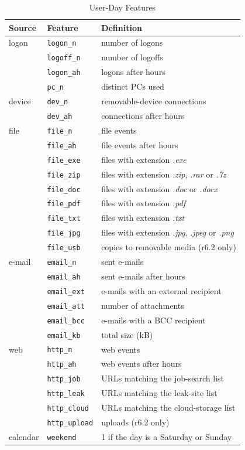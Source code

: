 \documentclass[10pt,onecolumn,letterpaper]{article}
\begin{document}
\begin{table}[!t]
\caption{User-Day Features\label{tab:s-features}}
\centering
\footnotesize
\begin{tabular}{@{}llp{4.6cm}@{}}
\toprule
Source & Feature & Definition \\
\midrule
logon  & \texttt{logon\_n}   & number of logons \\
       & \texttt{logoff\_n}  & number of logoffs \\
       & \texttt{logon\_ah}  & logons after hours \\
       & \texttt{pc\_n}      & distinct PCs used \\
device & \texttt{dev\_n}     & removable-device connections \\
       & \texttt{dev\_ah}    & connections after hours \\
file   & \texttt{file\_n}    & file events \\
       & \texttt{file\_ah}   & file events after hours \\
       & \texttt{file\_exe}  & files with extension \textit{.exe} \\
       & \texttt{file\_zip}  & files with extension \textit{.zip}, \textit{.rar} or \textit{.7z} \\
       & \texttt{file\_doc}  & files with extension \textit{.doc} or \textit{.docx} \\
       & \texttt{file\_pdf}  & files with extension \textit{.pdf} \\
       & \texttt{file\_txt}  & files with extension \textit{.txt} \\
       & \texttt{file\_jpg}  & files with extension \textit{.jpg}, \textit{.jpeg} or \textit{.png} \\
       & \texttt{file\_usb}  & copies to removable media (r6.2 only) \\
e-mail & \texttt{email\_n}   & sent e-mails \\
       & \texttt{email\_ah}  & sent e-mails after hours \\
       & \texttt{email\_ext} & e-mails with an external recipient \\
       & \texttt{email\_att} & number of attachments \\
       & \texttt{email\_bcc} & e-mails with a BCC recipient \\
       & \texttt{email\_kb}  & total size (kB) \\
web    & \texttt{http\_n}    & web events \\
       & \texttt{http\_ah}   & web events after hours \\
       & \texttt{http\_job}  & URLs matching the job-search list \\
       & \texttt{http\_leak} & URLs matching the leak-site list \\
       & \texttt{http\_cloud}& URLs matching the cloud-storage list \\
       & \texttt{http\_upload}& uploads (r6.2 only) \\
calendar & \texttt{weekend} & 1 if the day is a Saturday or Sunday \\
\bottomrule
\end{tabular}
\end{table}
\end{document}

